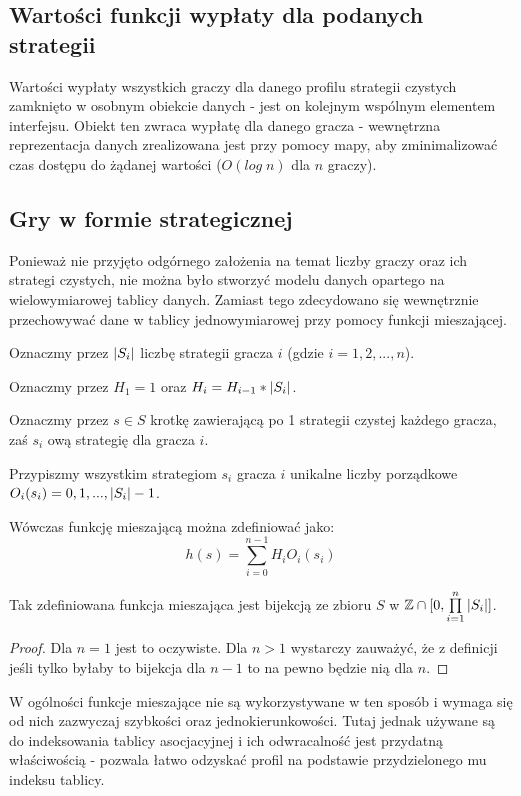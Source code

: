 \documentclass[polish]{standalone}
\begin{document}
\subsection{Wartości funkcji wypłaty dla podanych strategii}

Wartości wypłaty wszystkich graczy dla danego profilu strategii czystych zamknięto w osobnym obiekcie danych - jest on
kolejnym wspólnym elementem interfejsu. Obiekt ten zwraca wypłatę dla danego gracza - wewnętrzna reprezentacja danych
zrealizowana jest przy pomocy mapy, aby zminimalizować czas dostępu do żądanej wartości ($O(log\;n)$ dla $n$ graczy).

\subsection{Gry w formie strategicznej}

Ponieważ nie przyjęto odgórnego założenia na temat liczby graczy oraz ich strategi czystych, nie można było stworzyć
modelu danych opartego na wielowymiarowej tablicy danych. Zamiast tego zdecydowano się wewnętrznie przechowywać dane
w tablicy jednowymiarowej przy pomocy funkcji mieszającej.

Oznaczmy przez $|S_i|$ liczbę strategii gracza $i$ (gdzie $i = 1, 2, ..., n$).

Oznaczmy przez $H_1 = 1$ oraz $H_i = H_{i-1} * |S_i|$.

Oznaczmy przez $s \in S$ krotkę zawierającą po 1 strategii czystej każdego gracza, zaś $s_i$ ową strategię
dla gracza $i$.

Przypiszmy wszystkim strategiom $s_i$ gracza $i$ unikalne liczby porządkowe $O_i(s_i) = 0, 1, ..., |S_i|-1$.

Wówczas funkcję mieszającą można zdefiniować jako:
$$h(s) = \sum\limits_{i=0}^{n-1} H_i O_i(s_i)$$

\begin{theorem}
Tak zdefiniowana funkcja mieszająca jest bijekcją ze zbioru $S$ w $ \mathbb{Z} \cap [0, \prod\limits_{i=1}^{n} |S_i|] $.
\end{theorem}

\begin{proof}
Dla $n = 1$ jest to oczywiste. Dla $n > 1$ wystarczy zauważyć, że z definicji jeśli tylko byłaby to bijekcja dla $n-1$
to na pewno będzie nią dla $n$.
\end{proof}

W ogólności funkcje mieszające nie są wykorzystywane w ten sposób i wymaga się od nich zazwyczaj szybkości oraz
jednokierunkowości. Tutaj jednak używane są do indeksowania tablicy asocjacyjnej i ich odwracalność jest przydatną
właściwością - pozwala łatwo odzyskać profil na podstawie przydzielonego mu indeksu tablicy.
\end{document}
